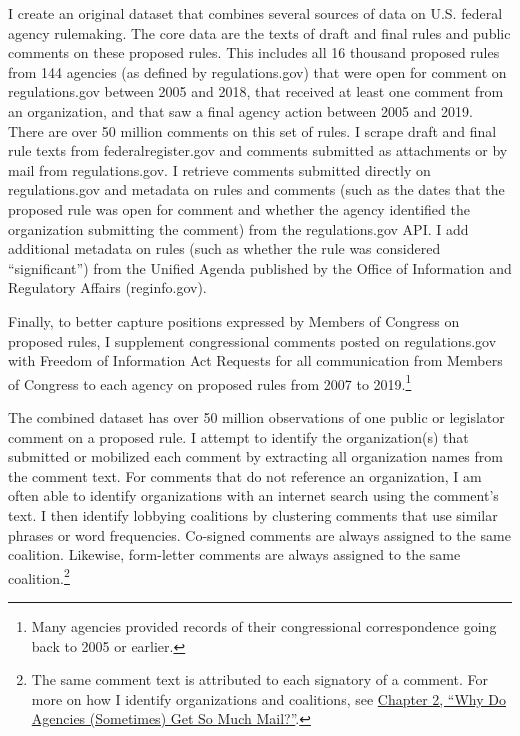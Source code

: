 \documentclass[
      12pt,
        ]{article}
\begin{document}
I create an original dataset that combines several sources of data on U.S. federal agency rulemaking.
The core data are the texts of draft and final rules and public comments on these proposed rules.
This includes all 16 thousand proposed rules from 144 agencies (as defined by regulations.gov) that were open for comment on regulations.gov between 2005 and 2018, that received at least one comment from an organization, and that saw a final agency action between 2005 and 2019.
There are over 50 million comments on this set of rules.
I scrape draft and final rule texts from federalregister.gov and comments submitted as attachments or by mail from regulations.gov.
I retrieve comments submitted directly on regulations.gov and metadata on rules and comments (such as the dates that the proposed rule was open for comment and whether the agency identified the organization submitting the comment) from the regulations.gov API.
I add additional metadata on rules (such as whether the rule was considered ``significant'') from the Unified Agenda published by the Office of Information and Regulatory Affairs (reginfo.gov).

Finally, to better capture positions expressed by Members of Congress on proposed rules, I supplement congressional comments posted on regulations.gov with Freedom of Information Act Requests for all communication from Members of Congress to each agency on proposed rules from 2007 to 2019.\footnote{Many agencies provided records of their congressional correspondence going back to 2005 or earlier.}

The combined dataset has over 50 million observations of one public or legislator comment on a proposed rule. I attempt to identify the organization(s) that submitted or mobilized each comment by extracting all organization names from the comment text. For comments that do not reference an organization, I am often able to identify organizations with an internet search using the comment's text. I then identify lobbying coalitions by clustering comments that use similar phrases or word frequencies. Co-signed comments are always assigned to the same coalition. Likewise, form-letter comments are always assigned to the same coalition.\footnote{The same comment text is attributed to each signatory of a comment. For more on how I identify organizations and coalitions, see \href{https://judgelord.github.io/dissertation/whyMail.pdf}{Chapter 2, ``Why Do Agencies (Sometimes) Get So Much Mail?''}.}
\end{document}

